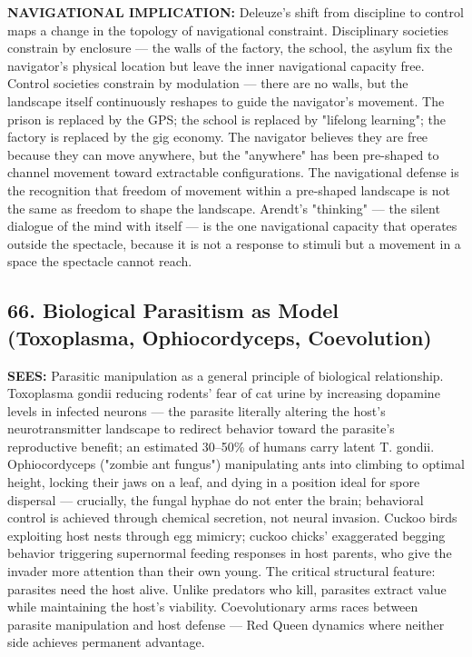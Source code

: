 \textbf{NAVIGATIONAL IMPLICATION:} Deleuze's shift from discipline to control maps a change in the topology of navigational constraint. Disciplinary societies constrain by enclosure — the walls of the factory, the school, the asylum fix the navigator's physical location but leave the inner navigational capacity free. Control societies constrain by modulation — there are no walls, but the landscape itself continuously reshapes to guide the navigator's movement. The prison is replaced by the GPS; the school is replaced by "lifelong learning"; the factory is replaced by the gig economy. The navigator believes they are free because they can move anywhere, but the "anywhere" has been pre-shaped to channel movement toward extractable configurations. The navigational defense is the recognition that freedom of movement within a pre-shaped landscape is not the same as freedom to shape the landscape. Arendt's "thinking" — the silent dialogue of the mind with itself — is the one navigational capacity that operates outside the spectacle, because it is not a response to stimuli but a movement in a space the spectacle cannot reach.


\bigskip\noindent\makebox[\textwidth]{\color{rulegray}\rule{5cm}{0.3pt}}\bigskip


\subsection*{66. Biological Parasitism as Model (Toxoplasma, Ophiocordyceps, Coevolution)}


\textbf{SEES:} Parasitic manipulation as a general principle of biological relationship. Toxoplasma gondii reducing rodents' fear of cat urine by increasing dopamine levels in infected neurons — the parasite literally altering the host's neurotransmitter landscape to redirect behavior toward the parasite's reproductive benefit; an estimated 30–50\% of humans carry latent T. gondii. Ophiocordyceps ("zombie ant fungus") manipulating ants into climbing to optimal height, locking their jaws on a leaf, and dying in a position ideal for spore dispersal — crucially, the fungal hyphae do not enter the brain; behavioral control is achieved through chemical secretion, not neural invasion. Cuckoo birds exploiting host nests through egg mimicry; cuckoo chicks' exaggerated begging behavior triggering supernormal feeding responses in host parents, who give the invader more attention than their own young. The critical structural feature: parasites need the host alive. Unlike predators who kill, parasites extract value while maintaining the host's viability. Coevolutionary arms races between parasite manipulation and host defense — Red Queen dynamics where neither side achieves permanent advantage.



